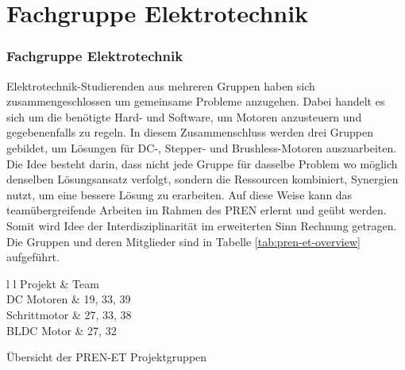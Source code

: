 \ifSTANDALONE
\section{Fachgruppe Elektrotechnik}
\fi
\ifEMBED
\subsubsection{Fachgruppe Elektrotechnik}
\label{chap:Fachgruppe Elektrotechnik}
\fi
Elektrotechnik-Studierenden aus mehreren Gruppen haben sich
zusammengeschlossen um gemeinsame Probleme anzugehen. Dabei handelt es sich
um die benötigte Hard- und Software, um Motoren anzusteuern
und gegebenenfalls zu regeln. In diesem Zusammenschluss werden drei Gruppen
gebildet, um Lösungen für DC-, Stepper- und Brushless-Motoren auszuarbeiten.
Die Idee besteht darin, dass nicht jede Gruppe für dasselbe Problem wo
möglich denselben Lösungsansatz verfolgt, sondern die Ressourcen kombiniert,
Synergien nutzt, um eine bessere Lösung zu erarbeiten. Auf diese Weise kann
das teamübergreifende Arbeiten im Rahmen des PREN erlernt und
geübt werden. Somit wird Idee der Interdisziplinarität im erweiterten Sinn
Rechnung getragen. Die Gruppen und deren Mitglieder sind in Tabelle 
\ref{tab:pren-et-overview} aufgeführt.
\begin{table}[h!]
	\centering
	\begin{zebratabular}{l l}
		 Projekt		& Team \\
		DC Motoren   & 19, 33, 39 \\
		Schrittmotor & 27, 33, 38 \\
		BLDC Motor   & 27, 32 \\
	\end{zebratabular}
	\caption{Übersicht der PREN-ET Projektgruppen}
	\label{tab:pren-et-overview}
\end{table}
